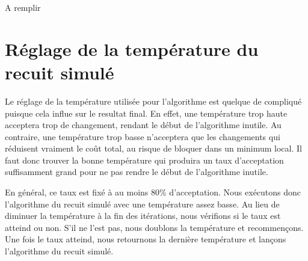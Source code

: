 \documentclass{article}
\begin{document}
A remplir

\section*{Réglage de la température du recuit simulé}

Le réglage de la température utilisée pour l'algorithme est quelque de compliqué puisque cela influe sur le resultat final.
En effet, une température trop haute acceptera trop de changement, rendant le début de l'algorithme inutile.
Au contraire, une température trop basse n'acceptera que les changements qui réduisent vraiment le coût total, au risque de bloquer dans un minimum local.
Il faut donc trouver la bonne température qui produira un taux d'acceptation suffisamment grand pour ne pas rendre le début de l'algorithme inutile.

En général, ce taux est fixé à au moins 80\% d'acceptation.
Nous exécutons donc l'algorithme du recuit simulé avec une température assez basse.
Au lieu de diminuer la température à la fin des itérations, nous vérifions si le taux est atteind ou non.
S'il ne l'est pas, nous doublons la température et recommençons.
Une fois le taux atteind, nous retournons la dernière température et lançons l'algorithme du recuit simulé.
\end{document}
